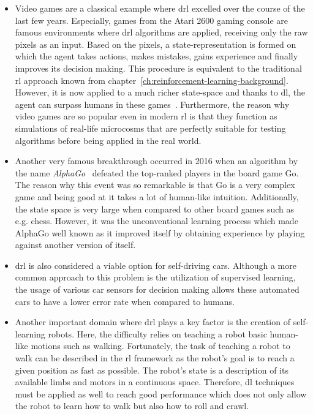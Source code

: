 \documentclass[draft,final]{vutinfth} %
\begin{document}
    \begin{itemize}
        \item Video games are a classical example where \gls{drl} excelled over the course of the last few years.
        Especially, games from the Atari 2600 gaming console are famous environments where \gls{drl} algorithms are applied, receiving only the raw pixels as an input.
        Based on the pixels, a state-representation is formed on which the agent takes actions, makes mistakes, gains experience and finally improves its decision making.
        This procedure is equivalent to the traditional \gls{rl} approach known from chapter~\ref{ch:reinforcement-learning-background}.
        However, it is now applied to a much richer state-space and thanks to \gls{dl}, the agent can surpass humans in these games~\citep{mnih_playing_2013,schulman_trust_2015}.
        Furthermore, the reason why video games are so popular even in modern \gls{rl} is that they function as simulations of real-life microcosms that are perfectly suitable for testing algorithms before being applied in the real world.

        \item   Another very famous breakthrough occurred in 2016 when an algorithm by the name \textit{AlphaGo}~\citep{silver_mastering_2017} defeated the top-ranked players in the board game Go.
        The reason why this event was so remarkable is that Go is a very complex game and being good at it takes a lot of human-like intuition.
        Additionally, the state space is very large when compared to other board games such as e.g. chess.
        However, it was the unconventional learning process which made AlphaGo well known as it improved itself by obtaining experience by playing against another version of itself.

        \item   \gls{drl} is also considered a viable option for self-driving cars.
        Although a more common approach to this problem is the utilization of supervised learning, the usage of various car sensors for decision making allows these automated cars to have a lower error rate when compared to humans.
        \item   Another important domain where \gls{drl} plays a key factor is the creation of self-learning robots.
        Here, the difficulty relies on teaching a robot basic human-like motions such as walking.
        Fortunately, the task of teaching a robot to walk can be described in the \gls{rl} framework as the robot's goal is to reach a given position as fast as possible.
        The robot's state is a description of its available limbs and motors in a continuous space.
        Therefore, \gls{dl} techniques must be applied as well to reach good performance which does not only allow the robot to learn how to walk but also how to roll and crawl.
    \end{itemize}
\end{document}
